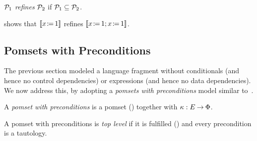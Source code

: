 \begin{definition}
  $\mathcal{P}_1$ \emph{refines} $\mathcal{P}_2$ if $\mathcal{P}_1\subseteq\mathcal{P}_2$.
\end{definition}

\begin{example}
   shows that $\sem{\PW{x}{1}}$ refines $\sem{\PW{x}{1}\SEMI\PW{x}{1}}$.
\end{example}

\subsection{Pomsets with Preconditions}
\label{sec:pomsets-pre}

The previous section modeled a language fragment without conditionals (and hence no
control dependencies) or expressions (and hence no data dependencies). We now
address this, by adopting a \emph{pomsets with preconditions} model
similar to~\cite{DBLP:journals/pacmpl/JagadeesanJR20}.

\begin{definition}
  A \emph{pomset with preconditions} is
  a pomset () together with $\kappa:E\mathbin\rightarrow\Phi$.
\end{definition}

\begin{definition}
  A pomset with preconditions is \emph{top level} if it is fulfilled () and
  every precondition is a tautology.
\end{definition}


